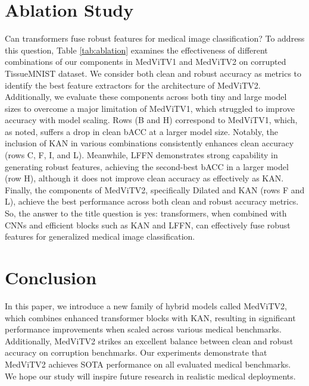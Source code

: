 \documentclass[times,twocolumn,final]{elsarticle}
\begin{document}
\section{Ablation Study}
Can transformers fuse robust features for medical image classification? To address this question, Table \ref{tab:ablation} examines the effectiveness of different combinations of our components in MedViTV1 and MedViTV2 on corrupted TissueMNIST dataset. We consider both clean and robust accuracy as metrics to identify the best feature extractors for the architecture of MedViTV2. Additionally, we evaluate these components across both tiny and large model sizes to overcome a major limitation of MedViTV1, which struggled to improve accuracy with model scaling.
Rows (B and H) correspond to MedViTV1, which, as noted, suffers a drop in clean bACC at a larger model size. Notably, the inclusion of KAN in various combinations consistently enhances clean accuracy (rows C, F, I, and L). Meanwhile, LFFN demonstrates strong capability in generating robust features, achieving the second-best bACC in a larger model (row H), although it does not improve clean accuracy as effectively as KAN. Finally, the components of MedViTV2, specifically Dilated and KAN (rows F and L), achieve the best performance across both clean and robust accuracy metrics.
So, the answer to the title question is yes: transformers, when combined with CNNs and efficient blocks such as KAN and LFFN, can effectively fuse robust features for generalized medical image classification.



\section{Conclusion}
In this paper, we introduce a new family of hybrid models called MedViTV2, which combines enhanced transformer blocks with KAN, resulting in significant performance improvements when scaled across various medical benchmarks. Additionally, MedViTV2 strikes an excellent balance between clean and robust accuracy on corruption benchmarks. Our experiments demonstrate that MedViTV2 achieves SOTA performance on all evaluated medical benchmarks. We hope our study will inspire future research in realistic medical deployments.



% 


\end{document}
